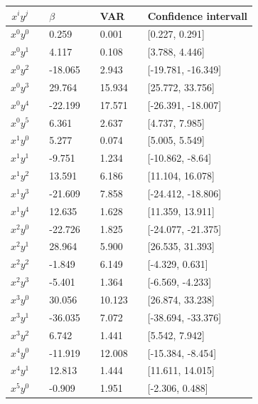   \begin{center}
 \label{tab:Confidenceintervall_OLS}
 \begin{tabularx}{\textwidth}{c X l X l X l }
     \hline
     \hline
     $x^iy^j$ && $\beta$ && VAR && Confidence intervall \\
     \hline
$x^0y^0$     && 0.259   && 0.001   &&  [0.227, 0.291]     \\ 
$x^0y^1$     && 4.117   && 0.108   &&  [3.788, 4.446]     \\ 
$x^0y^2$     && -18.065 && 2.943   &&  [-19.781, -16.349] \\ 
$x^0y^3$     && 29.764  && 15.934  &&  [25.772, 33.756]   \\ 
$x^0y^4$     && -22.199 && 17.571  &&  [-26.391, -18.007] \\ 
$x^0y^5$     && 6.361   && 2.637   &&  [4.737, 7.985]     \\ 
$x^1y^0$     && 5.277   && 0.074   &&  [5.005, 5.549]     \\ 
$x^1y^1$     && -9.751  && 1.234   &&  [-10.862, -8.64]   \\ 
$x^1y^2$     && 13.591  && 6.186   &&  [11.104, 16.078]   \\ 
$x^1y^3$     && -21.609 && 7.858   &&  [-24.412, -18.806] \\ 
$x^1y^4$     && 12.635  && 1.628   &&  [11.359, 13.911]   \\ 
$x^2y^0$     && -22.726 && 1.825   &&  [-24.077, -21.375] \\ 
$x^2y^1$     && 28.964  && 5.900   &&  [26.535, 31.393]   \\ 
$x^2y^2$     && -1.849  && 6.149   &&  [-4.329, 0.631]    \\ 
$x^2y^3$     && -5.401  && 1.364   &&  [-6.569, -4.233]   \\ 
$x^3y^0$     && 30.056  && 10.123  &&  [26.874, 33.238]   \\ 
$x^3y^1$     && -36.035 && 7.072   &&  [-38.694, -33.376] \\ 
$x^3y^2$     && 6.742   && 1.441   &&  [5.542, 7.942]     \\ 
$x^4y^0$     && -11.919 && 12.008  &&  [-15.384, -8.454]  \\ 
$x^4y^1$     && 12.813  && 1.444   &&  [11.611, 14.015]   \\ 
$x^5y^0$     && -0.909  && 1.951   &&  [-2.306, 0.488]    \\ 

     \hline
 \end{tabularx}
 \end{center}

